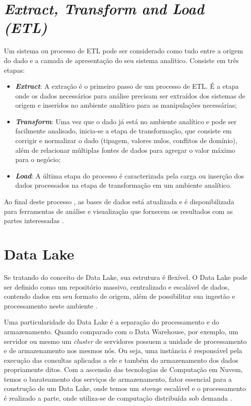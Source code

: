 \section{\textit{Extract, Transform and Load (ETL)}} Um sistema ou processo de \ac{ETL} pode ser considerado como tudo entre a origem do dado e a camada de apresentação do seu sistema analítico. Consiste em três etapas:
\begin{itemize}
\item \textbf{\textit{Extract}}: A extração é o primeiro passo de um processo de ETL. É a etapa onde os dados necessários para análise precisam ser extraídos dos sistemas de origem e inseridos no ambiente analítico para as manipulações necessárias;
\item \textbf{\textit{Transform}}: Uma vez que o dado já está no ambiente analítico e pode ser facilmente analisado, inicia-se a etapa de transformação, que consiste em corrigir e normalizar o dado (tipagem, valores nulos, conflitos de domínio), além de relacionar múltiplas fontes de dados para agregar o valor máximo para o negócio;
\item \textbf{\textit{Load}}: A última etapa do processo é caracterizada pela carga ou inserção dos dados processados na etapa de transformação em um ambiente analítico.
\end{itemize}
Ao final deste processo , as bases de dados está atualizada e é disponibilizada para ferramentas de análise e visualização que fornecem os resultados com as partes interessadas \cite{thedatawarehousetoolkit}.

\section{Data Lake} Se tratando do conceito de Data Lake, sua estrutura é flexível. O Data Lake pode ser definido como um repositório massivo, centralizado e escalável de dados, contendo dados em seu formato de origem, além de possibilitar sua ingestão e processamento neste ambiente \cite{bigdatafastdatadatalake}. 

Uma particularidade do Data Lake é a separação do processamento e do armazenamento. Quando comparado com o Data Warehouse, por exemplo, um servidor ou mesmo um \textit{cluster} de servidores possuem a unidade de processamento e de armazenamento nos mesmos nós. Ou seja, uma instância é responsável pela execução das consultas aplicadas a ele e também do armazenamento dos dados propriamente ditos. Com a ascensão das tecnologias de Computação em Nuvem, temos o barateamento dos serviços de armazenamento, fator essencial para a construção de um Data Lake, onde temos um \textit{storage} escalável e o processamento é realizado a parte, onde utiliza-se de computação distribuída sob demanda \cite{datalakeforenterprises}. 


